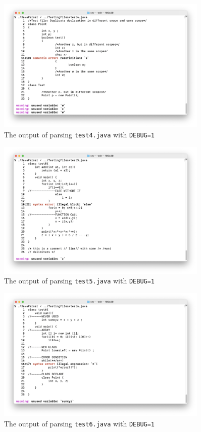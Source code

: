 \documentclass[12pt]{article}
\begin{document}
\begin{figure}
\begin{center}
\includegraphics[width=0.9\textwidth]{Screenshots/test4}
\end{center}
\caption{The output of parsing \texttt{test4.java} with \texttt{DEBUG=1}}
\label{test1}
\end{figure}
\begin{figure}
\begin{center}
\includegraphics[width=0.9\textwidth]{Screenshots/test5}
\end{center}
\caption{The output of parsing \texttt{test5.java} with \texttt{DEBUG=1}}
\label{test1}
\end{figure}
\begin{figure}
\begin{center}
\includegraphics[width=0.9\textwidth]{Screenshots/test6}
\end{center}
\caption{The output of parsing \texttt{test6.java} with \texttt{DEBUG=1}}
\label{test1}
\end{figure}
\end{document}
